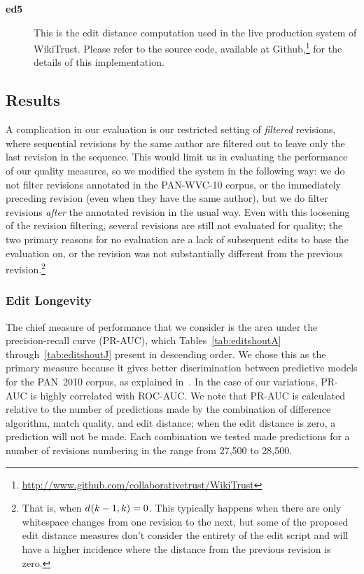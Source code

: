 \begin{description}
\item[\textbf{ed5}] This is the edit distance computation used
    in the live production system of WikiTrust.
    Please refer to the source code, available at
    Github,\footnote{\url{http://www.github.com/collaborativetrust/WikiTrust}}
    for the details of this implementation.

\end{description}

\subsection{Results}

A complication in our evaluation is our restricted setting of
\textit{filtered} revisions, where sequential revisions by the
same author are filtered out to leave only the last revision
in the sequence.
This would limit us in evaluating the performance of our
quality measures, so we modified the system in the following way:
we do not filter revisions annotated in the PAN-WVC-10 corpus,
or the immediately preceding revision (even when they have the
same author), but we do filter revisions \textit{after} the annotated
revision in the usual way.
Even with this loosening of the revision filtering, several
revisions are still not evaluated for quality; the two
primary reasons for no evaluation are a lack of subsequent
edits to base the evaluation on, or the revision was not
substantially different from the previous
revision.\footnote{That is, when $d_{}(k-1,k) = 0$.
This typically happens when there are only whitespace changes
from one revision to the next, but some of the proposed edit distance
measures don't consider the entirety of the edit script and
will have a higher incidence where the distance from the
previous revision is zero.}

\subsubsection{Edit Longevity}

The chief measure of performance that we consider is
the area under the precision-recall curve (PR-AUC),
which Tables~\ref{tab:editshoutA} through~\ref{tab:editshoutJ}
present in descending order.
We chose this as the primary measure because it gives better
discrimination between predictive models for the PAN~2010
corpus, as explained in~\cite{Potthast2010b}.
In the case of our variations, PR-AUC is highly correlated
with ROC-AUC.
We note that PR-AUC is calculated relative to the number of
predictions made by the combination of difference algorithm,
match quality, and edit distance; when the edit distance is
zero, a prediction will not be made.
Each combination we tested made predictions for a number of
revisions numbering in the range from 27,500 to 28,500.


